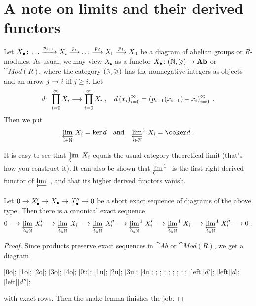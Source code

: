 \documentclass[a4paper,parskip=half,numbers=enddot, DIV=12]{scrreprt}
\renewcommand{\geq}{\geqslant}
\begin{document}
\section{A note on limits and their derived functors}
	Let $X_\bullet\colon \ldots\xrightarrow{p_{i+1}}X_i\morphism[p_i]\ldots\morphism[p_2]X_1\morphism[p_1]X_0$ be a diagram of abelian groups or $R$-modules. As usual, we may view $X_\bullet$ as a functor $X_\bullet\colon (\IN,\geq)\morphism \cat{Ab}$ or $\cat{Mod}(R)$, where the category $(\IN,\geq)$ has the nonnegative integers as objects and an arrow $j\morphism i$ iff $j\geq i$. Let 
	\begin{align*}
		d\colon \prod_{i=0}^{\infty}X_i\morphism\prod_{i=0}^\infty X_i\;,\quad d\left(x_i\right)_{i=0}^\infty=\left(p_{i+1}(x_{i+1})-x_i\right)_{i=0}^\infty\;.
	\end{align*}
	Then we put
	\begin{align*}
		\limit[i\in\IN]X_i=\ker d\quad\text{and}\quad\limit[i\in\IN][^1]X_i=\coker d\;.
	\end{align*}
\begin{rem}
	It is easy to see that $\limit X_i$ equals the usual category-theoretical limit (that's how you construct it). It can also be shown that $\limit[][^1]$ is the first right-derived functor of $\limit$, and that its higher derived functors vanish.
\end{rem}
\begin{fact}
	Let $0\morphism X'_\bullet\morphism X_\bullet\morphism X''_\bullet\morphism 0$ be a short exact sequence of diagrams of the above type. Then there is a canonical exact sequence
	\begin{align*}
		0\morphism \limit[i\in\IN] X'_i\morphism \limit[i\in\IN] X_i\morphism \limit[i\in\IN] X''_i\morphism \limit[i\in\IN][^1] X'_i\morphism \limit[i\in\IN][^1]X_i\morphism \limit[i\in\IN][^1] X''_i\morphism 0\;.
	\end{align*}
\end{fact}
\begin{proof}
	Since products preserve exact sequences in $\cat{Ab}$ or $\cat{Mod}(R)$, we get a diagram
	\begin{diagram*}
		[0o];
		[1o];
		[2o];
		[3o];
		[4o];
		[0u];
		[1u];
		[2u];
		[3u];
		[4u];
		\scriptsize
		;
		;
		;
		;
		;
		;
		;
		;
		[$d'$];
		[$d$];
		[$d''$];
	\end{diagram*}
	with exact rows. Then the snake lemma finishes the job.
\end{proof}
\end{document}
